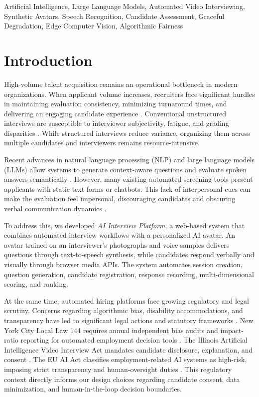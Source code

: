 \documentclass[conference]{IEEEtran}
\begin{document}
\begin{IEEEkeywords}
Artificial Intelligence, Large Language Models, Automated Video Interviewing, Synthetic Avatars, Speech Recognition, Candidate Assessment, Graceful Degradation, Edge Computer Vision, Algorithmic Fairness
\end{IEEEkeywords}

\section{Introduction}

High-volume talent acquisition remains an operational bottleneck in modern organizations. When applicant volume increases, recruiters face significant hurdles in maintaining evaluation consistency, minimizing turnaround times, and delivering an engaging candidate experience \cite{cappelli,levashina}. Conventional unstructured interviews are susceptible to interviewer subjectivity, fatigue, and grading disparities \cite{salgado}. While structured interviews reduce variance, organizing them across multiple candidates and interviewers remains resource-intensive.

Recent advances in natural language processing (NLP) and large language models (LLMs) allow systems to generate context-aware questions and evaluate spoken answers semantically \cite{devlin,brown}. However, many existing automated screening tools present applicants with static text forms or chatbots. This lack of interpersonal cues can make the evaluation feel impersonal, discouraging candidates and obscuring verbal communication dynamics \cite{bauer}.

To address this, we developed \textit{AI Interview Platform}, a web-based system that combines automated interview workflows with a personalized AI avatar. An avatar trained on an interviewer's photographs and voice samples delivers questions through text-to-speech synthesis, while candidates respond verbally and visually through browser media APIs. The system automates session creation, question generation, candidate registration, response recording, multi-dimensional scoring, and ranking.

At the same time, automated hiring platforms face growing regulatory and legal scrutiny. Concerns regarding algorithmic bias, disability accommodations, and transparency have led to significant legal actions and statutory frameworks \cite{hirevue,aclu}. New York City Local Law 144 requires annual independent bias audits and impact-ratio reporting for automated employment decision tools \cite{nyclaw}. The Illinois Artificial Intelligence Video Interview Act mandates candidate disclosure, explanation, and consent \cite{illinois}. The EU AI Act classifies employment-related AI systems as high-risk, imposing strict transparency and human-oversight duties \cite{euaiact}. This regulatory context directly informs our design choices regarding candidate consent, data minimization, and human-in-the-loop decision boundaries.
\end{document}
